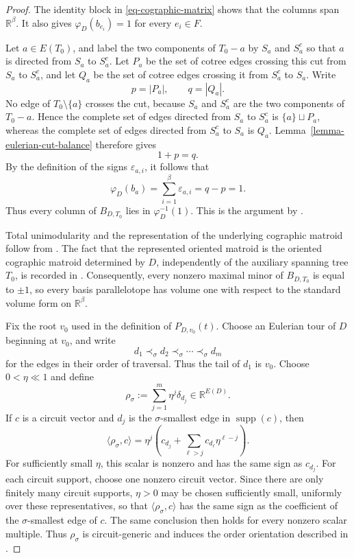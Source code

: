 \documentclass[12pt]{amsart}
\numberwithin{equation}{section}
\numberwithin{theorem}{section}
\newcommand{\R}{\mathbb{R}}
\begin{document}
\begin{proof}
  The identity block in \eqref{eq-cographic-matrix} shows that the columns span $\R^\beta$. It also gives $\varphi_D(b_{e_i})=1$ for every $e_i\in F$.

  Let $a\in E(T_0)$, and label the two components of $T_0-a$ by $S_a$ and $S_a^c$ so that $a$ is directed from $S_a$ to $S_a^c$. Let $P_a$ be the set of cotree edges crossing this cut from $S_a$ to $S_a^c$, and let $Q_a$ be the set of cotree edges crossing it from $S_a^c$ to $S_a$. Write
  \[
  p=|P_a|, \qquad q=|Q_a|.
  \]
  No edge of $T_0\setminus\{a\}$ crosses the cut, because $S_a$ and $S_a^c$ are the two components of $T_0-a$. Hence the complete set of edges directed from $S_a$ to $S_a^c$ is $\{a\}\sqcup P_a$, whereas the complete set of edges directed from $S_a^c$ to $S_a$ is $Q_a$. Lemma~\ref{lemma-eulerian-cut-balance} therefore gives
  \[
  1+p=q.
  \]
  By the definition of the signs $\varepsilon_{a,i}$, it follows that
  \[
  \varphi_D(b_a) = \sum_{i=1}^{\beta}\varepsilon_{a,i}
  = q-p = 1.
  \]
  Thus every column of $B_{D,T_0}$ lies in $\varphi_D^{-1}(1)$. This is the argument by \cite[Lemma~4.12]{KMP}.

  Total unimodularity and the representation of the underlying cographic matroid follow from \cite[Theorem~4.9]{KMP}. The fact that the represented oriented matroid is the oriented cographic matroid determined by $D$, independently of the auxiliary spanning tree $T_0$, is recorded in \cite[Remark~4.13]{KMP}. Consequently, every nonzero maximal minor of $B_{D,T_0}$ is equal to $\pm1$, so every basis parallelotope has volume one with respect to the standard volume form on $\mathbb R^\beta$.

  Fix the root $v_0$ used in the definition of $P_{D,v_0}(t)$. Choose an Eulerian tour of $D$ beginning at $v_0$, and write
  \[
  d_1\prec_\sigma d_2\prec_\sigma\cdots\prec_\sigma d_m
  \]
  for the edges in their order of traversal. Thus the tail of $d_1$ is $v_0$. Choose $0<\eta\ll1$ and define
  \[
  \rho_\sigma := \sum_{j=1}^{m}\eta^j\delta_{d_j} \in \mathbb R^{E(D)}.
  \]
  If $c$ is a circuit vector and $d_j$ is the $\sigma$-smallest edge in $\operatorname{supp}(c)$, then
  \[
  \langle\rho_\sigma,c\rangle = \eta^j \left(c_{d_j}+\sum_{\ell>j}c_{d_\ell}\eta^{\ell-j}\right).
  \]
  For sufficiently small $\eta$, this scalar is nonzero and has the same sign as $c_{d_j}$. For each circuit support, choose one nonzero circuit vector. Since there are only finitely many circuit supports, $\eta>0$ may be chosen sufficiently small, uniformly over these representatives, so that $\langle\rho_\sigma,c\rangle$ has the same sign as the coefficient of the $\sigma$-smallest edge of $c$. The same conclusion then holds for every nonzero scalar multiple. Thus $\rho_\sigma$ is circuit-generic and induces the order orientation described in \cite[Remark 3.2]{KMP}.


\end{proof}
\end{document}
